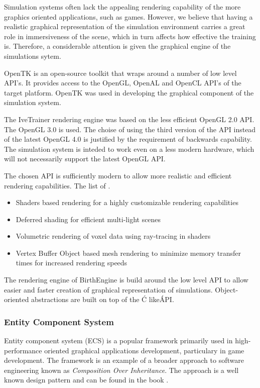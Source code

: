   Simulation systems often lack the appealing rendering capability of the more graphics oriented applications, such as games. However, we believe that having a realistic graphical representation of the simulation environment carries a great role in immersiveness of the scene, which in turn affects how effective the training is. Therefore, a considerable attention is given the graphical engine of the simulations sytem.

  OpenTK \citep{opentk} is an open-source toolkit that wraps around a number of low level API's. It provides access to the OpenGL, OpenAL and OpenCL API's of the target platform. OpenTK was used in developing the graphical component of the simulation system.

  The IveTrainer rendering engine was based on the less efficient OpenGL 2.0 API. The OpenGL 3.0 is used. The choise of using the third version of the API instead of the latest OpenGL 4.0 is justified by the requirement of backwards capability. The simulation system is inteded to work even on a less modern hardware, which will not necessarily support the latest OpenGL API.

  The chosen API is sufficiently modern to allow more realistic and efficient rendering capabilities. The list of .

  \begin{itemize}
    \item Shaders based rendering for a highly customizable rendering capabilities
    \item Deferred shading for efficient multi-light scenes
    \item Volumetric rendering of voxel data using ray-tracing in shaders
    \item Vertex Buffer Object based mesh rendering to minimize memory transfer times for increased rendering speeds
  \end{itemize}

  The rendering engine of BirthEngine is build around the low level API to allow easier and faster creation of graphical representation of simulations. Object-oriented abstractions are built on top of the \'C like\' API.

\subsubsection{Entity Component System}

Entity component system (ECS) is a popular framework primarily used in high-performance oriented graphical applications development, particulary in game development. The framework is an example of a broader approach to software engineering known as \textit{Composition Over Inheritance}. The approach is a well known design pattern and can be found in the book \citep{Freeman:2004:HFD:1076324}.

